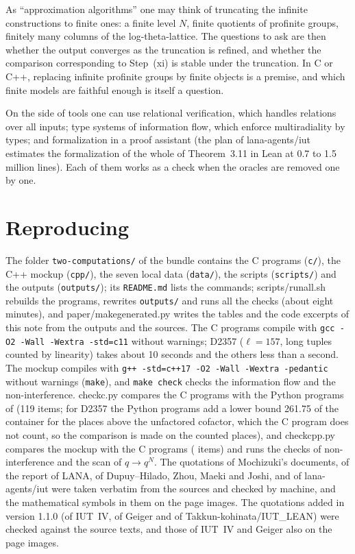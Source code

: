 \documentclass[11pt,a4paper]{article}
\newcommand{\leanus}{\textunderscore\allowbreak}
\newcommand{\lean}[1]{{\ttfamily\let\_\leanus #1}}
\newcommand{\lab}[2]{{\upshape\fcolorbox{#1}{#1!8}{\scriptsize\sffamily\bfseries\textcolor{#1}{#2}}}}
\newcommand{\tagH}{\lab{BurntOrange}{H}}
\begin{document}
\tagH{} As ``approximation algorithms'' one may think of truncating the infinite constructions to finite ones: a finite
level $N$, finite quotients of profinite groups, finitely many columns of the log-theta-lattice. The questions to ask
are then whether the output converges as the truncation is refined, and whether the comparison corresponding to
Step~(xi) is stable under the truncation. In C or C++, replacing infinite profinite groups by finite objects is a
premise, and which finite models are faithful enough is itself a question.

\tagH{} On the side of tools one can use relational verification, which handles relations over all inputs; type systems
of information flow, which enforce multiradiality by types; and formalization in a proof assistant (the plan of
lana-agents/iut estimates the formalization of the whole of Theorem~3.11 in Lean at 0.7 to 1.5 million lines). Each of
them works as a check when the oracles are removed one by one.

\section{Reproducing}
The folder \texttt{two-computations/} of the bundle contains the C programs (\texttt{c/}), the C++ mockup
(\texttt{cpp/}), the seven local data (\texttt{data/}), the scripts (\texttt{scripts/}) and the outputs
(\texttt{outputs/}); its \texttt{README.md} lists the commands; \lean{scripts/run\_all.sh} rebuilds the programs, rewrites \texttt{outputs/}
and runs all the checks (about eight minutes), and \lean{paper/make\_generated.py} writes the tables and the code
excerpts of this note from the outputs and the sources. The C programs compile with
\texttt{gcc -O2 -Wall -Wextra -std=c11} without warnings; D2357 ($\ell=157$, long tuples counted by linearity) takes
about 10 seconds and the others less than a second. The mockup compiles with
\texttt{g++ -std=c++17 -O2 -Wall -Wextra -pedantic} without warnings (\texttt{make}), and \texttt{make check} checks the
information flow and the non-interference. \lean{check\_c.py} compares the C programs with the Python programs of
\cite{RF} (119 items; for D2357 the Python programs add a lower bound 261.75 of the container for the places above the
unfactored cofactor, which the C program does not count, so the comparison is made on the counted places), and
\lean{check\_cpp.py} compares the mockup with the C programs (\cppitems{} items) and runs the checks of
non-interference and the scan of $q\to q^N$. The quotations of Mochizuki's documents, of the report of LANA, of
Dupuy--Hilado, Zhou, Maeki and Joshi, and of lana-agents/iut were taken verbatim from the sources and checked by
machine, and the mathematical symbols in them on the page images. The quotations added in version 1.1.0 (of IUT~IV, of
Geiger and of Takkun-kohinata/IUT\_LEAN) were checked against the source texts, and those of IUT~IV and Geiger also on
the page images.
\end{document}
